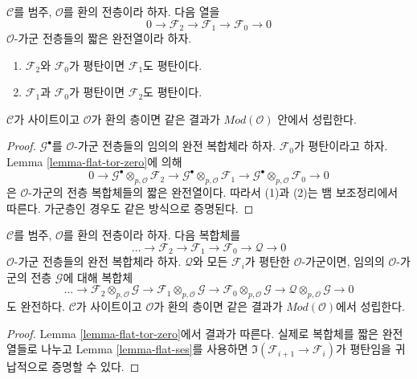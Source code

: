 \begin{lemma}
\label{lemma-flat-ses}
$\mathcal{C}$를 범주, $\mathcal{O}$를 환의 전층이라 하자. 다음 열을
$$
0 \to
\mathcal{F}_2 \to
\mathcal{F}_1 \to
\mathcal{F}_0 \to 0
$$
$\mathcal{O}$-가군 전층들의 짧은 완전열이라 하자.
\begin{enumerate}
\item $\mathcal{F}_2$와 $\mathcal{F}_0$가 평탄이면 $\mathcal{F}_1$도
평탄이다.
\item $\mathcal{F}_1$과 $\mathcal{F}_0$가 평탄이면 $\mathcal{F}_2$도
평탄이다.
\end{enumerate}
$\mathcal{C}$가 사이트이고 $\mathcal{O}$가 환의 층이면 같은 결과가
$\textit{Mod}(\mathcal{O})$ 안에서 성립한다.
\end{lemma}

\begin{proof}
$\mathcal{G}^\bullet$를 $\mathcal{O}$-가군 전층들의 임의의 완전 복합체라
하자. $\mathcal{F}_0$가 평탄이라고 하자. Lemma
\ref{lemma-flat-tor-zero}에 의해
$$
0 \to
\mathcal{G}^\bullet \otimes_{p, \mathcal{O}} \mathcal{F}_2 \to
\mathcal{G}^\bullet \otimes_{p, \mathcal{O}} \mathcal{F}_1 \to
\mathcal{G}^\bullet \otimes_{p, \mathcal{O}} \mathcal{F}_0 \to 0
$$
은 $\mathcal{O}$-가군의 전층 복합체들의 짧은 완전열이다. 따라서 (1)과
(2)는 뱀 보조정리에서 따른다. 가군층인 경우도 같은 방식으로 증명된다.
\end{proof}

\begin{lemma}
\label{lemma-flat-resolution-of-flat}
$\mathcal{C}$를 범주, $\mathcal{O}$를 환의 전층이라 하자. 다음 복합체를
$$
\ldots \to
\mathcal{F}_2 \to
\mathcal{F}_1 \to
\mathcal{F}_0 \to
\mathcal{Q} \to 0
$$
$\mathcal{O}$-가군 전층들의 완전 복합체라 하자. $\mathcal{Q}$와 모든
$\mathcal{F}_i$가 평탄한 $\mathcal{O}$-가군이면, 임의의
$\mathcal{O}$-가군의 전층 $\mathcal{G}$에 대해 복합체
$$
\ldots \to
\mathcal{F}_2 \otimes_{p, \mathcal{O}} \mathcal{G} \to
\mathcal{F}_1 \otimes_{p, \mathcal{O}} \mathcal{G} \to
\mathcal{F}_0 \otimes_{p, \mathcal{O}} \mathcal{G} \to
\mathcal{Q} \otimes_{p, \mathcal{O}} \mathcal{G} \to 0
$$
도 완전하다. $\mathcal{C}$가 사이트이고 $\mathcal{O}$가 환의 층이면 같은
결과가 $\textit{Mod}(\mathcal{O})$에서 성립한다.
\end{lemma}

\begin{proof}
Lemma \ref{lemma-flat-tor-zero}에서 결과가 따른다. 실제로 복합체를 짧은
완전열들로 나누고 Lemma \ref{lemma-flat-ses}를 사용하면
$\Im(\mathcal{F}_{i + 1} \to \mathcal{F}_i)$가 평탄임을 귀납적으로
증명할 수 있다.
\end{proof}


